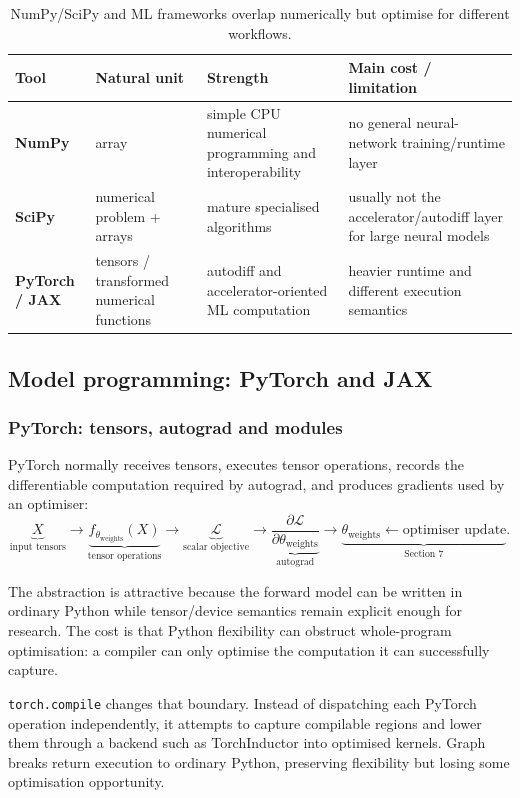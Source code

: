 \begin{table}[ht]
\centering
\small
\begin{tabularx}{\textwidth}{>{\bfseries}p{2.3cm} X X X}
\toprule
Tool & Natural unit & Strength & Main cost / limitation \\
\midrule
NumPy & array & simple CPU numerical programming and interoperability & no general neural-network training/runtime layer \\
SciPy & numerical problem + arrays & mature specialised algorithms & usually not the accelerator/autodiff layer for large neural models \\
PyTorch / JAX & tensors / transformed numerical functions & autodiff and accelerator-oriented ML computation & heavier runtime and different execution semantics \\
\bottomrule
\end{tabularx}
\caption{NumPy/SciPy and ML frameworks overlap numerically but optimise for different workflows.}
\end{table}


\subsection{Model programming: PyTorch and JAX}

\subsubsection*{PyTorch: tensors, autograd and modules}

PyTorch normally receives tensors, executes tensor operations, records the differentiable computation required by autograd, and produces gradients used by an optimiser:
\[
\underbrace{X}_{\text{input tensors}}
\rightarrow
\underbrace{f_{\theta_{\text{weights}}}(X)}_{\text{tensor operations}}
\rightarrow
\underbrace{\mathcal{L}}_{\text{scalar objective}}
\rightarrow
\underbrace{\frac{\partial \mathcal{L}}{\partial \theta_{\text{weights}}}}_{\text{autograd}}
\rightarrow
\underbrace{\theta_{\text{weights}}\leftarrow\text{optimiser update}}_{\text{Section 7}}.
\]

The abstraction is attractive because the forward model can be written in ordinary Python while tensor/device semantics remain explicit enough for research.
The cost is that Python flexibility can obstruct whole-program optimisation: a compiler can only optimise the computation it can successfully capture.

\texttt{torch.compile} changes that boundary.
Instead of dispatching each PyTorch operation independently, it attempts to capture compilable regions and lower them through a backend such as TorchInductor into optimised kernels.
Graph breaks return execution to ordinary Python, preserving flexibility but losing some optimisation opportunity.

